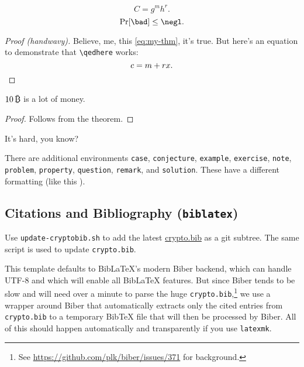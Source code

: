 \begin{theorem}[My Theorem]\label{thm:my-thm}
  \begin{equation}\label{eq:my-thm}
    C = g^mh^r.
  \end{equation}
  \begin{equation}\label{eq:my-thm2}
    \Pr[\bad] \le \negl.
  \end{equation}
\end{theorem}
\begin{proof}[Proof (handwavy)]
  Believe, me, this \cref{eq:my-thm}, it's true.
  But here's an equation to demonstrate that \verb|\qedhere| works:
  \[ c = m+rx . \qedhere \]
\end{proof}

\begin{lemma}\label{thm:a-lemma}
  $10\,\btcsym$ is a lot of money.
\end{lemma}
\begin{proof}
  Follows from the theorem.
\end{proof}

\begin{assumption}\label{ass:very-hard}
  It's hard, you know?
\end{assumption}

\begin{remark}\label{rem:add-env}
  There are additional environments
  \texttt{case}, \texttt{conjecture}, \texttt{example}, \texttt{exercise}, \texttt{note}, \texttt{problem}, \texttt{property}, \texttt{question}, \texttt{remark}, and \texttt{solution}.
  These have a different formatting (like this ).
\end{remark}


\subsection{Citations and Bibliography (\texttt{biblatex})}
Use \texttt{update-cryptobib.sh} to add the latest \href{https://cryptobib.di.ens.fr/}{crypto.bib} as a git subtree.
The same script is used to update \texttt{crypto.bib}.

This template defaults to BibLaTeX's modern Biber backend, which can handle UTF-8 and which will enable all BibLaTeX features.
But since Biber tends to be slow and will need over a minute to parse the huge \texttt{crypto.bib},\footnote{See \url{https://github.com/plk/biber/issues/371} for background.}
we use a wrapper around Biber that automatically extracts only the cited entries from \texttt{crypto.bib} to a temporary BibTeX file that will then be processed by Biber.
All of this should happen automatically and transparently if you use \texttt{latexmk}.


